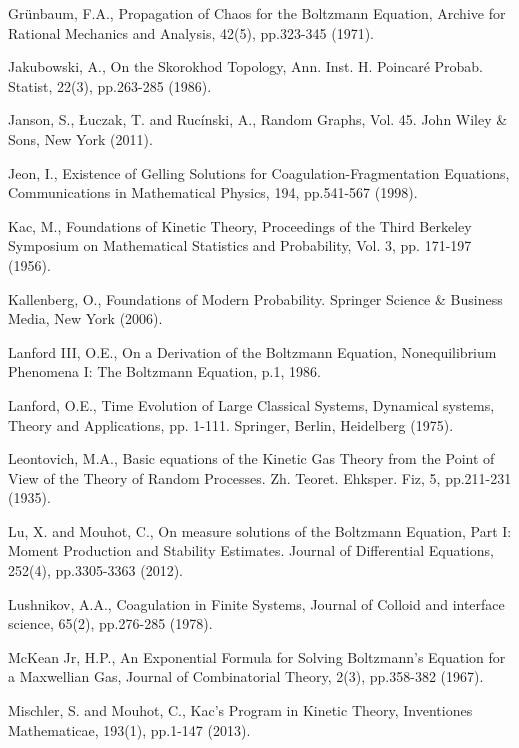 \documentclass[11pt, notitlepage]{article}
\begin{document}
\begin{thebibliography}{}
 Gr\"unbaum, F.A., Propagation of Chaos for the Boltzmann Equation, Archive for Rational Mechanics and Analysis, 42(5), pp.323-345 (1971).


 Jakubowski, A., On the Skorokhod Topology, Ann. Inst. H. Poincar\'e Probab. Statist, 22(3), pp.263-285 (1986).

 Janson, S., \L{}uczak, T. and Ruc\'{i}nski, A., Random Graphs, Vol. 45. John Wiley \& Sons, New York (2011).


 Jeon, I., Existence of Gelling Solutions for Coagulation-Fragmentation Equations, Communications in Mathematical Physics, 194, pp.541-567 (1998).

 Kac, M., Foundations of Kinetic Theory, Proceedings of the Third Berkeley Symposium on Mathematical Statistics and Probability, Vol. 3, pp. 171-197 (1956). 

 Kallenberg, O., Foundations of Modern Probability. Springer Science \& Business Media, New York (2006).

 Lanford III, O.E., On a Derivation of the Boltzmann Equation, Nonequilibrium Phenomena I: The Boltzmann Equation, p.1, 1986.

 Lanford, O.E., Time Evolution of Large Classical Systems, Dynamical systems, Theory and Applications, pp. 1-111. Springer, Berlin, Heidelberg (1975).

 Leontovich, M.A., Basic equations of the Kinetic Gas Theory from the Point of View of the Theory of Random Processes. Zh. Teoret. Ehksper. Fiz, 5, pp.211-231 (1935).

 Lu, X. and Mouhot, C., On measure solutions of the Boltzmann Equation, Part I: Moment Production and Stability Estimates. Journal of Differential Equations, 252(4), pp.3305-3363 (2012).


 Lushnikov, A.A., Coagulation in Finite Systems, Journal of Colloid and interface science, 65(2), pp.276-285 (1978).

 McKean Jr, H.P., An Exponential Formula for Solving Boltzmann's Equation for a Maxwellian Gas, Journal of Combinatorial Theory, 2(3), pp.358-382 (1967).

 Mischler, S. and Mouhot, C., Kac's Program in Kinetic Theory, Inventiones Mathematicae, 193(1), pp.1-147 (2013).



\end{thebibliography}
\end{document}
